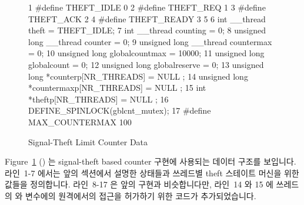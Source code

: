 \begin{figure}[tbp]
{ \scriptsize
\begin{verbbox}
  1 #define THEFT_IDLE  0
  2 #define THEFT_REQ   1
  3 #define THEFT_ACK   2
  4 #define THEFT_READY 3
  5 
  6 int __thread theft = THEFT_IDLE;
  7 int __thread counting = 0;
  8 unsigned long __thread counter = 0;
  9 unsigned long __thread countermax = 0;
 10 unsigned long globalcountmax = 10000;
 11 unsigned long globalcount = 0;
 12 unsigned long globalreserve = 0;
 13 unsigned long *counterp[NR_THREADS] = { NULL };
 14 unsigned long *countermaxp[NR_THREADS] = { NULL };
 15 int *theftp[NR_THREADS] = { NULL };
 16 DEFINE_SPINLOCK(gblcnt_mutex);
 17 #define MAX_COUNTERMAX 100
\end{verbbox}
}
\centering
\theverbbox
\caption{Signal-Theft Limit Counter Data}
\label{fig:count:Signal-Theft Limit Counter Data}
\end{figure}

Figure~\ref{fig:count:Signal-Theft Limit Counter Data}
()
는 signal-theft based counter 구현에 사용되는 데이터 구조를 보입니다.
라인~1-7 에서는 앞의 섹션에서 설명한 상태들과 쓰레드별 theft 스테이트 머신을
위한 값들을 정의합니다.
라인~8-17 은 앞의 구현과 비슷합니다만, 라인~14 와 15 에 쓰레드의
 와  변수에의 원격에서의 접근을 허가하기 위한 코드가
추가되었습니다.

